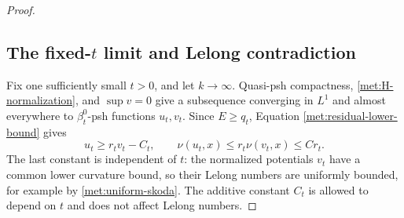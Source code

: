 \begin{proof}
\subsection*{The fixed-\texorpdfstring{$t$}{t} limit and Lelong contradiction}

Fix one sufficiently small \(t>0\), and let \(k\to\infty\).
Quasi-psh compactness, \eqref{met:H-normalization}, and \(\sup v=0\)
give a subsequence converging in \(L^1\) and almost everywhere to
\(\beta_t^0\)-psh functions \(u_t,v_t\).  Since \(E\geq q_t\),
Equation \eqref{met:residual-lower-bound} gives
\begin{equation}
 \label{met:limit-lelong-upper}
 u_t\geq r_tv_t-C_t,
 \qquad \nu(u_t,x)\leq r_t\nu(v_t,x)\leq C r_t.
\end{equation}
The last constant is independent of \(t\): the normalized potentials
\(v_t\) have a common lower curvature bound, so their Lelong numbers
are uniformly bounded, for example by \eqref{met:uniform-skoda}.
The additive constant \(C_t\) is allowed to depend on \(t\) and
does not affect Lelong numbers.


\end{proof}
